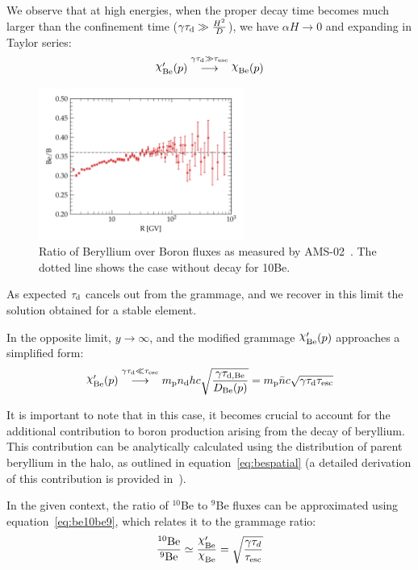 We observe that at high energies, when the proper decay time becomes much larger than the confinement time ($\gamma \tau_{\rm d} \gg \frac{H^2}{D}$), we have $\alpha H \rightarrow 0$ and expanding in Taylor series:
%
\begin{equation} 
\rchi_{\rm Be}^\prime(p) 
\oset{\gamma\tau_{\rm d} \gg \tau_{\rm esc}}{\longrightarrow} 
\rchi_{\rm Be}(p)
\end{equation}

\begin{figure}
\centering
\includegraphics[width=0.6\textwidth]{figures/BeB_AMS02.pdf}
\caption{Ratio of Beryllium over Boron fluxes as measured by AMS-02~\cite{AMS02libeb}. The dotted line shows the case without decay for 10Be.}
\label{fig:beb}
\end{figure}

As expected $\tau_{\rm d}$ cancels out from the grammage, and we recover in this limit the solution obtained for a stable element.

In the opposite limit, $y \rightarrow \infty$, and the modified grammage $\rchi_{\rm Be}^\prime(p)$ approaches a simplified form:
%
\begin{equation}
\rchi_{\rm Be}^\prime(p) 
\oset{\gamma\tau_{\rm d} \ll \tau_{\rm esc}}{\longrightarrow} 
m_{\rm p} n_{\rm d} h c \sqrt{\frac{\gamma\tau_{\rm d, Be}}{D_{\rm Be}(p)}} = 
m_{\rm p} \bar n c \sqrt{\gamma \tau_{\rm d} \tau_{\rm esc}} 
\label{eq:be10be9}
\end{equation}

It is important to note that in this case, it becomes crucial to account for the additional contribution to boron production arising from the decay of beryllium. This contribution can be analytically calculated using the distribution of parent beryllium in the halo, as outlined in equation~\eqref{eq:bespatial} (a detailed derivation of this contribution is provided in~\cite{Evoli2020prd}).

In the given context, the ratio of $^{10}$Be to $^9$Be fluxes can be approximated using equation~\eqref{eq:be10be9}, which relates it to the grammage ratio:
%
\begin{equation}
\frac{\rm {^{10}}Be}{\rm {^{9}}Be} \simeq \frac{\rchi^\prime_{\rm Be}}{\rchi_{\rm Be}} = \sqrt{\frac{\gamma \tau_d}{\tau_{\rm esc}}}
\label{eq:chibe10be9}
\end{equation}

